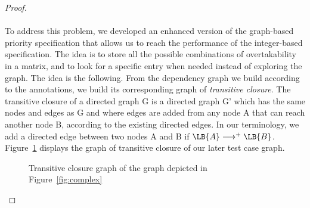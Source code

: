 \documentclass[11pt]{report}
\begin{document}
\begin{proof}
\paragraph{}
To address this problem, we developed an enhanced version of the graph-based priority specification that allows us to reach the performance of the integer-based specification. The idea is to store all the possible combinations of overtakability in a matrix, and to look for a specific entry when needed instead of exploring the graph. 
The idea is the following. From the dependency graph we build according to the annotations, we build its corresponding graph of \emph{transitive closure}. The transitive closure of a directed graph G is a directed graph G' which has the same nodes and edges as G and where edges are added from any node A that can reach another node B, according to the existing directed edges. In our terminology, we add a directed edge between two nodes A and B if $\LB{A}\longrightarrow^{+}\LB{B}$. Figure~\ref{fig:transitive} displays the graph of transitive closure of our later test case graph.

\begin{figure}[!ht]
      \caption{Transitive closure graph of the graph depicted in Figure~\ref{fig:complex}}
      \label{fig:transitive} 
\end{figure}


\end{proof}
\end{document}
